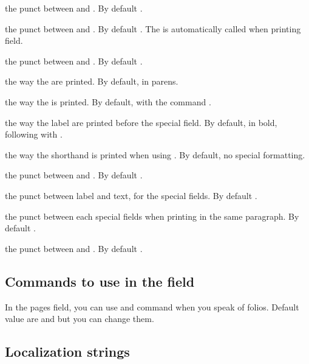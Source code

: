 \documentclass{ltxdockit}[2011/03/25]
\begin{document}
\begin{ltxsyntax}
 the punct between  and . By default .

 the punct between  and . By default . The  is automatically called when printing  field. 

 the punct between  and . By default .

 the way the  are printed. By default, in parens.

 the way the  is printed. By default, with the command .

 the way the label are printed before the special field. By default, in bold, following with .

 the way the shorthand is printed when using . By default, no special formatting.

 the punct between  and .  By default .

 the punct between label and text, for the special fields. By default .

 the punct between each special fields when printing in the same paragraph. By default .

 the punct between  and . By default .
\end{ltxsyntax}

\subsection{Commands to use in the  field}

In the pages field, you can use  and  command when you speak of folios. Default value are  and  but you can change them.

\subsection{Localization strings}
\end{document}
